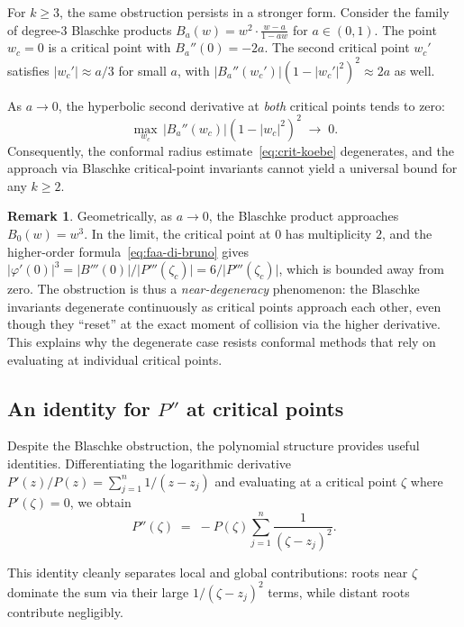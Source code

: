 \documentclass[11pt,a4paper]{amsart}
\theoremstyle{definition}
\newtheorem{remark}[theorem]{Remark}
\newcommand{\abs}[1]{\lvert #1 \rvert}
\begin{document}
For $k \geq 3$, the same obstruction persists in a stronger form.
Consider the family of degree-$3$ Blaschke products
$B_a(w) = w^2 \cdot \frac{w-a}{1-aw}$ for $a \in (0,1)$.
The point $w_c = 0$ is a critical point with $B_a''(0) = -2a$.
The second critical point $w_c'$ satisfies $\abs{w_c'} \approx a/3$
for small $a$, with $\abs{B_a''(w_c')}(1-\abs{w_c'}^2)^2 \approx 2a$
as well.

As $a \to 0$, the hyperbolic second derivative at \emph{both}
critical points tends to zero:
\[
  \max_{w_c}\, \abs{B_a''(w_c)}(1-\abs{w_c}^2)^2 \;\to\; 0.
\]
Consequently, the conformal radius estimate~\eqref{eq:crit-koebe}
degenerates, and the approach via Blaschke critical-point invariants
cannot yield a universal bound for any $k \geq 2$.

\begin{remark}
Geometrically, as $a \to 0$, the Blaschke product approaches
$B_0(w) = w^3$.  In the limit, the critical point at $0$ has
multiplicity $2$, and the higher-order formula~\eqref{eq:faa-di-bruno}
gives $\abs{\varphi'(0)}^3 = \abs{B'''(0)}/\abs{P'''(\zeta_c)} = 6/\abs{P'''(\zeta_c)}$,
which is bounded away from zero.  The obstruction is thus a
\emph{near-degeneracy} phenomenon: the Blaschke invariants degenerate
continuously as critical points approach each other, even though they
``reset'' at the exact moment of collision via the higher derivative.
This explains why the degenerate case resists conformal methods that
rely on evaluating at individual critical points.
\end{remark}

\subsection{An identity for $P''$ at critical points}

Despite the Blaschke obstruction, the polynomial structure provides
useful identities.  Differentiating the logarithmic derivative
$P'(z)/P(z) = \sum_{j=1}^n 1/(z-z_j)$ and evaluating at a critical
point $\zeta$ where $P'(\zeta) = 0$, we obtain
\begin{equation}\label{eq:Ppp-identity}
  P''(\zeta) \;=\; -P(\zeta) \sum_{j=1}^n \frac{1}{(\zeta - z_j)^2}.
\end{equation}

This identity cleanly separates local and global contributions:
roots near $\zeta$ dominate the sum via their large $1/(\zeta-z_j)^2$
terms, while distant roots contribute negligibly.
\end{document}

